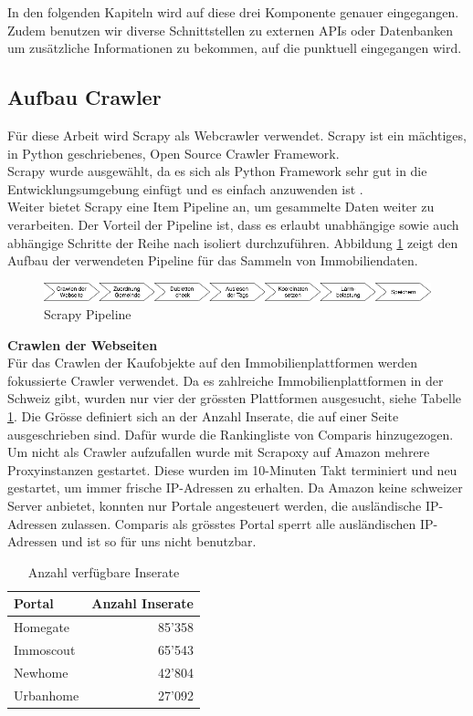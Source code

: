 In den folgenden Kapiteln wird auf diese drei Komponente genauer eingegangen.
Zudem benutzen wir diverse Schnittstellen zu externen APIs oder Datenbanken um zusätzliche Informationen zu bekommen, auf die punktuell eingegangen wird.

\subsection{Aufbau Crawler}
Für diese Arbeit wird Scrapy als Webcrawler verwendet. Scrapy ist ein mächtiges, in Python geschriebenes, Open Source Crawler Framework.\\
Scrapy wurde ausgewählt, da es sich als Python Framework sehr gut in die Entwicklungsumgebung einfügt und es einfach anzuwenden ist \cite{scrapy}.\\
Weiter bietet Scrapy eine Item Pipeline an, um gesammelte Daten weiter zu verarbeiten. Der Vorteil der Pipeline ist, dass es erlaubt unabhängige sowie auch abhängige Schritte der Reihe nach isoliert durchzuführen. Abbildung \ref{fig:scrapy} zeigt den Aufbau der verwendeten Pipeline für das Sammeln von Immobiliendaten.

\begin{figure}[h]
\centering
\includegraphics[width=\textwidth]{images/scrapy.png}
\caption[Scrapy Pipeline]{Scrapy Pipeline}%
\label{fig:scrapy}
\end{figure}

\textbf{Crawlen der Webseiten}\\
Für das Crawlen der Kaufobjekte auf den Immobilienplattformen werden fokussierte Crawler verwendet. Da es zahlreiche Immobilienplattformen in der Schweiz gibt, wurden nur vier der grössten Plattformen ausgesucht, siehe Tabelle \ref{tab:portals}. Die Grösse definiert sich an der Anzahl Inserate, die auf einer Seite ausgeschrieben sind. Dafür wurde die Rankingliste von Comparis hinzugezogen.\\
Um nicht als Crawler aufzufallen wurde mit Scrapoxy auf Amazon mehrere Proxyinstanzen gestartet. Diese wurden im 10-Minuten Takt terminiert und neu gestartet, um immer frische IP-Adressen zu erhalten. Da Amazon keine schweizer Server anbietet, konnten nur Portale angesteuert werden, die ausländische IP-Adressen zulassen. Comparis als grösstes Portal sperrt alle ausländischen IP-Adressen und ist so für uns nicht benutzbar.

\begin{table}[ht]
\centering
{}
\begin{tabular}{@{}lr@{}}
\toprule
Portal & Anzahl Inserate \\
\midrule
Homegate & 85'358\\
Immoscout & 65'543\\
Newhome & 42'804\\
Urbanhome & 27'092\\
\bottomrule
\end{tabular}
\caption{Anzahl verfügbare Inserate}
\label{tab:portals}
\end{table}

